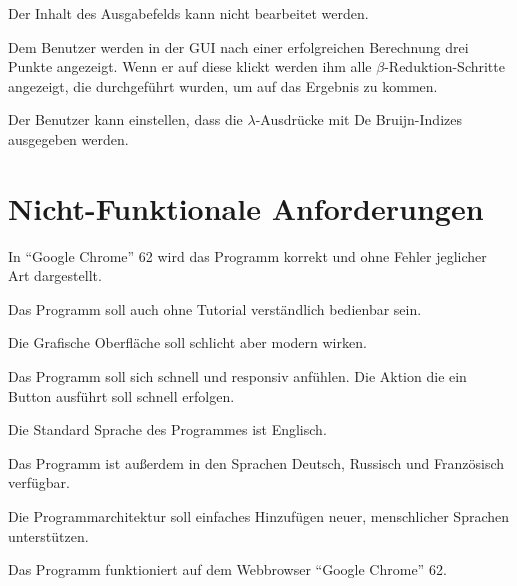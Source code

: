 \documentclass[parskip=full,11pt,twoside]{scrartcl}
\begin{document}
Der Inhalt des Ausgabefelds kann nicht bearbeitet werden.

Dem Benutzer werden in der GUI nach einer erfolgreichen Berechnung drei Punkte angezeigt. Wenn er auf diese klickt werden ihm alle $\beta$-Reduktion-Schritte angezeigt, die durchgeführt wurden, um auf das Ergebnis zu kommen.

Der Benutzer kann einstellen, dass die $\lambda$-Ausdrücke mit De Bruijn-Indizes ausgegeben werden.














\newpage
\section{Nicht-Funktionale Anforderungen}


In \enquote{Google Chrome} 62 wird das Programm korrekt und ohne Fehler jeglicher Art dargestellt.

Das Programm soll auch ohne Tutorial verständlich bedienbar sein.

Die Grafische Oberfläche soll schlicht aber modern wirken.

Das Programm soll sich schnell und responsiv anfühlen. Die Aktion die ein Button ausführt soll schnell erfolgen.

Die Standard Sprache des Programmes ist Englisch.

Das Programm ist außerdem in den Sprachen Deutsch, Russisch und Französisch verfügbar.

Die Programmarchitektur soll einfaches Hinzufügen neuer, menschlicher Sprachen unterstützen.

Das Programm funktioniert auf dem Webbrowser \enquote{Google Chrome} 62.
\end{document}
